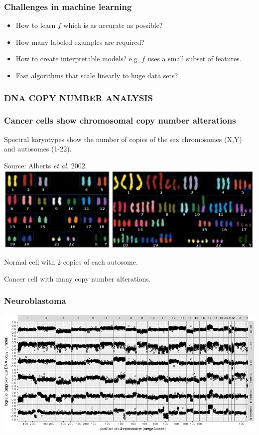 \documentclass{beamer}
\begin{document}
\begin{frame}
  \frametitle{Challenges in machine learning}
  \begin{itemize}
  \item How to learn $f$ which is as accurate as possible?
  \item How many labeled examples are required?
  \item How to create interpretable models? e.g. $f$ uses a small
    subset of features.
  \item Fast algorithms that scale linearly to huge data sets?
  \end{itemize}
\end{frame}

\begin{frame}
  \frametitle{DNA COPY NUMBER ANALYSIS}
\end{frame}

\begin{frame}
  \frametitle{Cancer cells show chromosomal copy number alterations}
  Spectral karyotypes show the number of copies of the sex chromosomes
  (X,Y) and autosomes (1-22). 

  Source: Alberts \emph{et al.} 2002.
\vskip 0.1in
  \includegraphics[width=\textwidth]{Karyo-both}
\vskip 0.1in
  \begin{minipage}{0.4\linewidth}
    Normal cell with 2 copies of each autosome.
  \end{minipage}
\linewidth
  \begin{minipage}{0.4\linewidth}
Cancer cell with many copy number alterations.
  \end{minipage}
\end{frame}

\begin{frame}
  \frametitle{Neuroblastoma }
  \includegraphics[width=\textwidth]{neuroblastoma-ok-relapse}
\end{frame}
\end{document}
